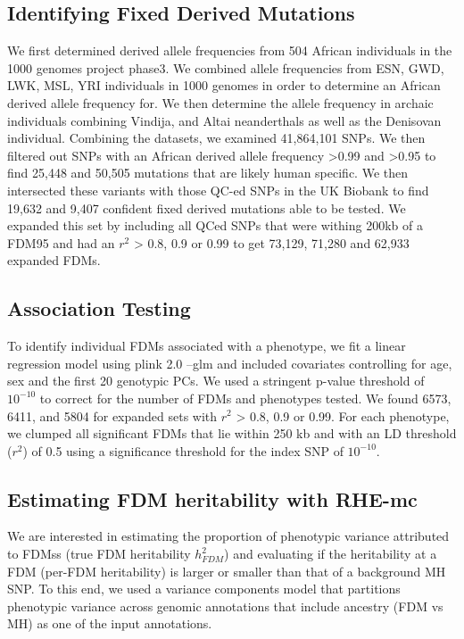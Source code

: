\subsection{Identifying Fixed Derived Mutations}
 We first determined derived allele frequencies from 504 African individuals in the 1000 genomes project phase3. We combined allele frequencies from ESN, GWD, LWK, MSL, YRI individuals in 1000 genomes in order to determine an African derived allele frequency for. We then determine the allele frequency in archaic individuals combining Vindija, and Altai neanderthals as well as the Denisovan individual. Combining the datasets, we examined 41,864,101 SNPs. We then filtered out SNPs with an African derived allele frequency >0.99 and >0.95 to find 25,448 and 50,505 mutations that are likely human specific. We then intersected these variants with those QC-ed SNPs in the UK Biobank to find 19,632 and 9,407 confident fixed derived mutations able to be tested. We expanded this set by including all QCed SNPs that were withing 200kb of a FDM95 and had an $r^2$ > 0.8, 0.9 or 0.99 to get 73,129, 71,280 and 62,933 expanded FDMs. 
 
\subsection{Association Testing}
To identify individual FDMs associated with a phenotype, we fit a linear regression model using plink 2.0 --glm and included covariates controlling for age, sex and the first 20 genotypic PCs. We used a stringent p-value threshold of $10^{-10}$ to correct for the number of FDMs and phenotypes tested. We found 6573, 6411, and 5804 for expanded sets with $r^2$ > 0.8, 0.9 or 0.99. For each phenotype, we clumped all significant FDMs that lie within 250 kb and with an LD threshold ($r^2$) of 0.5 using a significance threshold for the index SNP of $10^{-10}$.


\subsection{Estimating FDM heritability with RHE-mc}
We are interested in estimating the proportion of phenotypic variance attributed to FDMss (true FDM heritability $h^2_{FDM}$) and evaluating if the heritability at a FDM (per-FDM heritability) is larger or smaller than that of a background MH SNP. To this end, we used a variance components model that partitions phenotypic variance across genomic annotations that include ancestry (FDM vs MH) as one of the input annotations.

